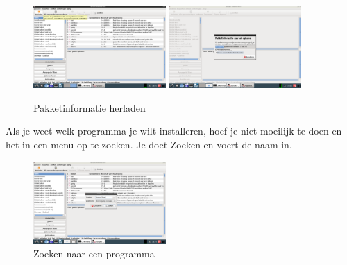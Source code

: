 \documentclass[12pt,a4paper]{article}
\begin{document}
\begin{figure} [H]
\centering
\includegraphics[width=0.45\textwidth]{plaatje04}
\includegraphics[width=0.45\textwidth]{plaatje05}
\caption{Pakketinformatie herladen}
\label{plaatje04}
\end{figure}

Als je weet welk programma je wilt installeren, hoef je niet moeilijk te doen en het in een menu op te zoeken. Je doet Zoeken en voert de naam in.

\begin{figure} [H]
\centering
\includegraphics[width=0.45\textwidth]{plaatje06}
\caption{Zoeken naar een programma}
\label{plaatje06}
\end{figure}
\end{document}
